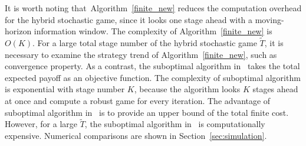 \fi
\begin{remark}
It is worth noting that~Algorithm~\ref{finite_new} reduces the computation overhead for the hybrid stochastic game, since it looks one stage ahead with a moving-horizon information window. The complexity of Algorithm~\eqref{finite_new} is $O(K)$. For a large total stage number of the hybrid stochastic game $\tilde{T}$, it is necessary to examine the strategy trend of Algorithm~\ref{finite_new}, such as convergence property. As a contrast, the suboptimal algorithm in~\cite{cdc_replay} takes the total expected payoff as an objective function. The complexity of suboptimal algorithm is exponential with stage number $K$, because the algorithm looks $K$ stages ahead at once and compute a robust game for every iteration. The advantage of suboptimal algorithm in~\cite{cdc_replay} is to provide an upper bound of the total finite cost. However, for a large $\tilde{T}$,  the suboptimal algorithm in~\cite{cdc_replay} is computationally expensive. Numerical comparisons are shown in Section~\ref{sec:simulation}.
\iffalse
To get a suboptimal total payoff of time $\tilde{T}$ faster, we can view this as a $K$ stage game, and at each stage the physical dynamics run $[\tilde{T}/K]$ steps as~\eqref{eq:xu}. The average payoff and state transition probability in the $[\tilde{T}/K]$ discrete time slots are the payoff and state transition probability of one game stage.  
In particular, when we consider the average of infinite horizon time $\tilde{T}$, the game can reduce to a stationary stochastic game. For example, with the infinite time average LQG cost as the payoff function, and the average detection rate, false alarm trigger rate as the state transition probability, we actually reach the optimal strategy of a stationary stochastic game.  
\fi

\end{remark}
